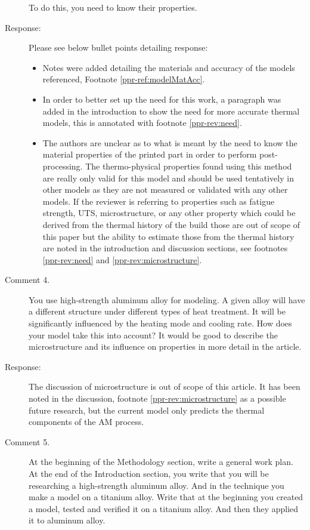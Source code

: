\documentclass{article}
\begin{document}
\begin{description}
	To do this, you need to know their properties.
	\item[Response:] Please see below bullet points detailing response:
		\begin{itemize}
			\item Notes were added detailing the materials and accuracy of the models referenced, Footnote \ref{ppr-ref:modelMatAcc}.
			\item In order to better set up the need for this work, a paragraph was added in the introduction to show the need for more accurate thermal models, this is annotated with footnote \ref{ppr-rev:need}.  
			\item The authors are unclear as to what is meant by the need to know the material properties of the printed part in order to perform post-processing.  The thermo-physical properties found using this method are really only valid for this model and should be used tentatively in other models as they are not measured or validated with any other models.  If the reviewer is referring to properties such as fatigue strength, UTS, microstructure, or any other property which could be derived from the thermal history of the build those are out of scope of this paper but the ability to estimate those from the thermal history are noted in the introduction and discussion sections, see footnotes \ref{ppr-rev:need} and \ref{ppr-rev:microstructure}.
		\end{itemize}
	\item[Comment 4.] You use high-strength aluminum alloy for modeling. A given alloy will have a different structure under different types of heat treatment. It will be significantly influenced by the heating mode and cooling rate. How does your model take this into account? It would be good to describe the microstructure and its influence on properties in more detail in the article.
	\item[Response:] The discussion of microstructure is out of scope of this article.  It has been noted in the discussion, footnote \ref{ppr-rev:microstructure} as a possible future research, but the current model only predicts the thermal components of the \ac{AM} process. 
	\item[Comment 5.] At the beginning of the Methodology section, write a general work plan. At the end of the Introduction section, you write that you will be researching a high-strength aluminum alloy. And in the technique you make a model on a titanium alloy. Write that at the beginning you created a model, tested and verified it on a titanium alloy. And then they applied it to aluminum alloy.

\end{description}
\end{document}
